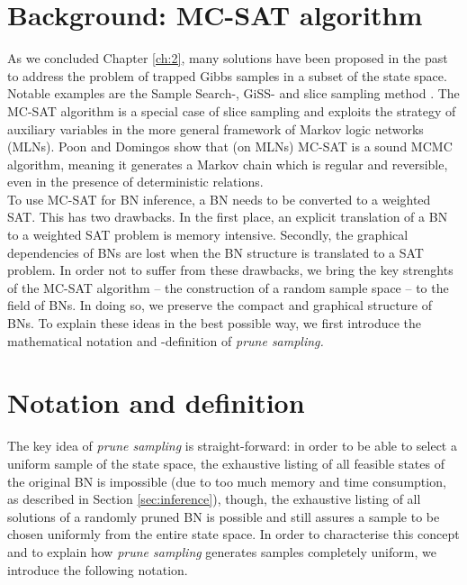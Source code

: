 \documentclass[a4paper, twoside, 11pt]{report}
\theoremstyle{plain}
\theoremstyle{definition}
\theoremstyle{remark}
\newcommand{\ps}{\textit{prune sampling }}
\newcommand{\psp}{\textit{prune sampling. }}
\begin{document}
\section{Background: MC-SAT algorithm}
As we concluded Chapter \ref{ch:2}, many solutions have been proposed in the past to address the problem of trapped Gibbs samples in a subset of the state space. Notable examples are the Sample Search-, GiSS- \cite{venugopal2013giss} and slice sampling method \cite{besag1993spatial, damlen1999gibbs, gilks1996interdisciplinary}. The MC-SAT algorithm \cite{poon2006sound} is a special case of slice sampling and exploits the strategy of auxiliary variables in the more general framework of Markov logic networks (MLNs). Poon and Domingos show that (on MLNs) MC-SAT is a sound MCMC algorithm, meaning it generates a Markov chain which is regular and reversible, even in the presence of deterministic relations. \\

To use MC-SAT for BN inference, a BN needs to be converted to a weighted \gls{SAT}. This has two drawbacks. In the first place, an explicit translation of a BN to a weighted SAT problem is memory intensive. Secondly, the graphical dependencies of BNs are lost when the BN structure is translated to a SAT problem. In order not to suffer from these drawbacks, we bring the key strenghts of the MC-SAT algorithm -- the construction of a random sample space --  to the field of BNs. In doing so, we preserve the compact and graphical structure of BNs. To explain these ideas in the best possible way, we first introduce the mathematical notation and -definition of \psp

\section{Notation and definition}
The key idea of \ps is straight-forward: in order to be able to select a uniform sample of the state space, the exhaustive listing of all feasible states of the original BN is impossible (due to too much memory and time consumption, as described in Section \ref{sec:inference}), though, the exhaustive listing of all solutions of a randomly pruned BN is possible and still assures a sample to be chosen uniformly from the entire state space. In order to characterise this concept and to explain how \ps generates samples completely uniform, we introduce the following notation. \\
\end{document}

